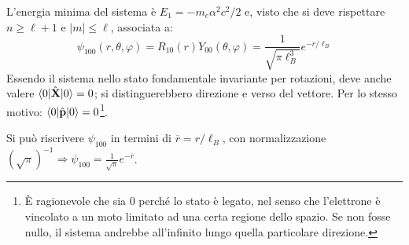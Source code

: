 \documentclass[11pt, a4paper]{scrartcl} %
\numberwithin{equation}{subsection}
\theoremstyle{style2}
\theoremstyle{style1}
\begin{document}
L'energia minima del sistema \`e $E_1 = - m_e \alpha ^2 c^2 / 2$ e, visto che si deve rispettare $n\ge \ell +1$ e $\lvert m \rvert \le  \ell $, associata a:
\begin{equation}
	\psi _{100} (r,\theta ,\varphi ) = R_{10} (r) Y_{00} (\theta ,\varphi ) = \frac{1}{\sqrt{\pi \ell _B^3} } e^{- r / \ell _B} 
\end{equation}
Essendo il sistema nello stato fondamentale invariante per rotazioni, deve anche valere $\braket{0|\hat{\mathbf{X} }|0} = 0$; si distinguerebbero direzione e verso del vettore. Per lo stesso motivo: $\braket{0|\hat{\mathbf{p} }|0}  =0$\footnote{\`E ragionevole che sia $0$ perch\'e lo stato \`e legato, nel senso che l'elettrone \`e vincolato a un moto limitato ad una certa regione dello spazio. Se non fosse nullo, il sistema andrebbe all'infinito lungo quella particolare direzione.}.

Si pu\`o riscrivere $\psi _{100} $ in termini di $\overline{r} = r / \ell _B$, con normalizzazione $(\sqrt{\pi} )^{-1} \Rightarrow \psi _{100} = \frac{1}{\sqrt{\pi} }e^{ - \overline{r}} $. 
\end{document}
